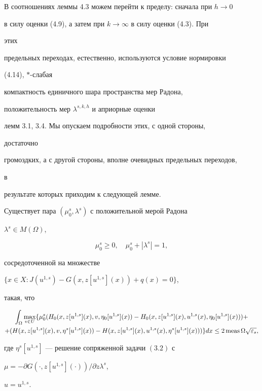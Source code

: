  


В соотношениях леммы 4.3 можем перейти к пределу: сначала при $h\to0$ 


в силу оценки (4.9), а затем при $k\to\infty$ в силу оценки (4.3). При 


этих 


предельных переходах, естественно, используются условие нормировки 


(4.14), $*$-слабая


компактность единичного шара пространства мер Радона,


положительность мер $\lambda^{s,k,h}$ и априорные оценки 


лемм 3.1, 3.4. Мы опускаем подробности этих, с одной стороны, 


достаточно 


громоздких, а с другой стороны, вполне очевидных предельных переходов, 


в 


результате которых приходим к следующей лемме. 


 


\begin{lems} 


Существует пара $(\mu^s_0,\lambda^s)$ с положительной мерой Радона 


$\lambda^s\in M(\Omega)$,


$$ 


\mu^s_0\ge0,\quad \mu^s_0+|\lambda^s|=1, 


$$ 


сосредоточенной на множестве 


$\{x\in X:J(u^{1,s})-G(x,z[u^{1,s}](x))+q(x)=0\}$, 


такая, что 


\begin{multline*} 


\int_\Omega\max_{v\in U}\{\mu^{s}_0(H_0 


(x,z[u^{1,s}](x),v,\eta_0[u^{1,s}](x))- 


H_0(x,z[u^{1,s}](x),u^{1,s}(x),\eta_0 


[u^{1,s}](x)))+ \\ 


% 


+(H(x,z[u^{1,s}](x),v, 


\eta^s[u^{1,s}](x))- 


H(x,z[u^{1,s}](x),u^{1,s}(x),\eta^s 


[u^{1,s}](x)))\}dx\le


2\meas\Omega\sqrt{\varepsilon_s}, 


\end{multline*} 


где $\eta^s[u^{1,s}]$ --- решение сопряженной задачи $(3.2)$ с 


$\mu=-\partial G(\cdot,z[u^{1,s}](\cdot))/\partial z\lambda^s$, 


$u=u^{1,s}$. 


\end{lems} 



